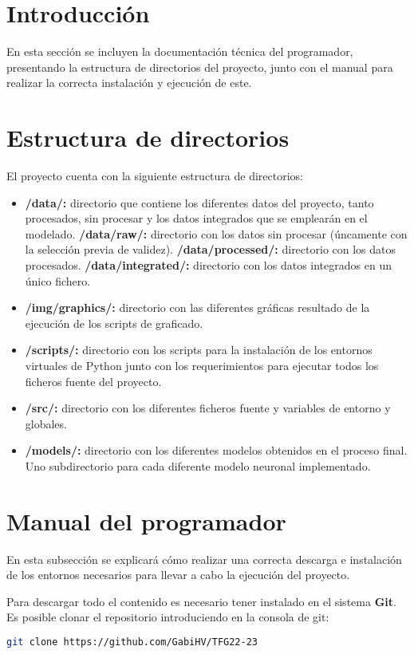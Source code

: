 
\section{Introducción}
En esta sección se incluyen la documentación técnica del programador, presentando la estructura de directorios del proyecto, junto con el manual para realizar la correcta 
instalación y ejecución de este. 

\section{Estructura de directorios}
El proyecto cuenta con la siguiente estructura de directorios:
\begin{itemize}
    \item \textbf{/data/:} directorio que contiene los diferentes datos del proyecto, tanto procesados, sin procesar y los datos integrados que se emplearán en el modelado.
    \subitem \textbf{/data/raw/:} directorio con los datos sin procesar (úncamente con la selección previa de validez).
    \subitem \textbf{/data/processed/:} directorio con los datos procesados.
    \subitem \textbf{/data/integrated/:} directorio con los datos integrados en un único fichero.
    \item \textbf{/img/graphics/:} directorio con las diferentes gráficas resultado de la ejecución de los scripts de graficado.
    \item \textbf{/scripts/:} directorio con los scripts para la instalación de los entornos virtuales de Python junto con los requerimientos para ejecutar todos los ficheros
        fuente del proyecto.
    \item \textbf{/src/:} directorio con los diferentes ficheros fuente y variables de entorno y globales.
    \item \textbf{/models/:} directorio con los diferentes modelos obtenidos en el proceso final. Uno subdirectorio para cada diferente modelo neuronal implementado.
\end{itemize}

\section{Manual del programador}
En esta subsección se explicará cómo realizar una correcta descarga e instalación de los entornos necesarios para llevar a cabo la ejecución del proyecto.

Para descargar todo el contenido es necesario tener instalado en el sistema \textbf{Git}. Es posible clonar el repositorio introduciendo en la consola de 
git: 
\begin{lstlisting}[language=Bash]
    git clone https://github.com/GabiHV/TFG22-23
\end{lstlisting}

